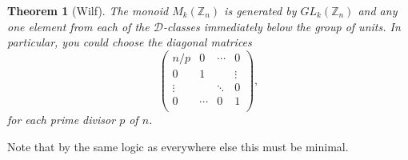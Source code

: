 \documentclass[11pt]{article}
\newtheorem{thm}{Theorem}[section]
\numberwithin{equation}{section}
\newcommand{\D}{\mathscr{D}}
\begin{document}
\begin{thm}[Wilf]
  The monoid $M_{k}(\mathbb{Z}_{n})$ is generated by $GL_{k}(\mathbb{Z}_{n})$ and
  any one element from each of the $\D$-classes immediately below the group of
  units. In particular, you could choose
  the diagonal matrices
  $$\begin{pmatrix}
    n/p    & 0      & \cdots & 0  \\
    0      & 1      &        & \vdots \\
    \vdots &        & \ddots & 0 \\
    0      & \cdots & 0      & 1  \\
   \end{pmatrix},$$
   for each prime divisor $p$ of $n$.
\end{thm}
Note that by the same logic as everywhere else this must be minimal.

\printbibliography
\end{document}
